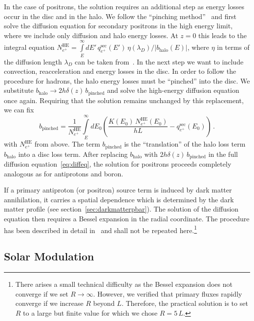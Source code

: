 \documentclass[a4paper,11pt]{article}
\begin{document}
In the case of positrons, the solution requires an additional step as energy losses occur in the disc and in the halo. We follow the ``pinching method''~\cite{Boudaud:2016jvj} and first solve the diffusion equation for secondary positrons in the high energy limit, where we include only diffusion and halo energy losses. At $z=0$ this leads to the integral equation $N_{e^+}^{\text{HE}}=\int\limits_{E}^{\infty}dE'\,q_{e^+}^\text{sec}(E')\,\eta(\lambda_D)/|b_{\text{halo}}(E)|$, where $\eta$ in terms of the diffusion length $\lambda_D$ can be taken from~\cite{Delahaye:2008ua}.
In the next step we want to include convection, reacceleration and energy losses in the disc. In order to follow the procedure for hadrons, the halo energy losses must be ``pinched'' into the disc. We substitute $b_{\text{halo}}\rightarrow 2 h \delta(z) \,b_{\text{pinched}}$ and solve the high-energy diffusion equation once again. Requiring that the solution remains unchanged by this replacement, we can fix
\begin{equation}
 b_{\text{pinched}} = \frac{1}{N_{e^+}^{\text{HE}}}\int\limits_E^\infty dE_0 \left(\frac{K(E_0)\,N_{e^+}^{\text{HE}}(E_0) }{hL}-q_{e^+}^\text{sec}(E_0)\right)\,.
\end{equation}
with $N_{e^+}^{\text{HE}}$ from above. The term $b_{\text{pinched}}$ is the ``translation'' of the halo loss term $b_{\text{halo}}$ into a disc loss term. After replacing $b_{\text{halo}}$ with $2 h \delta(z)\,b_{\text{pinched}}$ in the full diffusion equation~\eqref{eq:diffeq}, the solution for positrons proceeds completely analogous as for antiprotons and boron.

If a primary antiproton (or positron) source term is induced by dark matter annihilation, it carries a spatial dependence which is determined by the dark matter profile (see section~\ref{sec:darkmatterpbar}). The solution of the diffusion equation then requires a Bessel expansion in the radial coordinate. The procedure has been described in detail in~\cite{Barrau:2001ev,Donato:2003xg} and shall not be repeated here.\footnote{There arises a small technical difficulty as the Bessel expansion does not converge if we set $R\rightarrow\infty$. However, we verified that primary fluxes rapidly converge if we increase $R$ beyond $L$. Therefore, the practical solution is to set $R$ to a large but finite value for which we chose $R=5\,L$.}

\subsection{Solar Modulation}\label{sec:solarmodulation}
\end{document}
